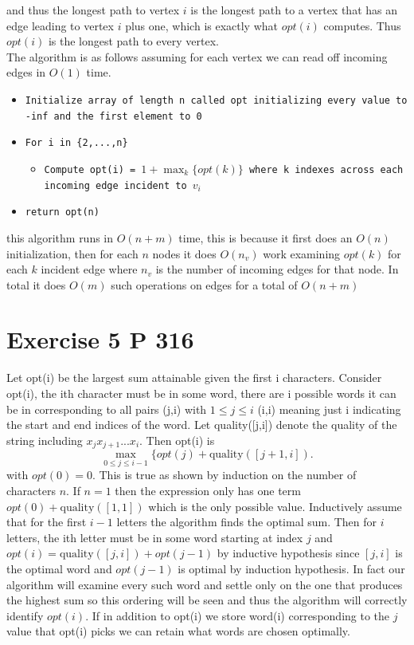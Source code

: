 \documentclass{amsart}
\begin{document}
and thus the longest path to vertex $i$ is the longest path to a vertex that has an edge leading to vertex  $i$ plus one, which is exactly what $opt(i)$ computes. Thus $opt(i)$ is
the longest path to every vertex.
\\
The algorithm is as follows assuming for each vertex we can read off incoming edges in $O(1)$ time.
{\small
    \begin{itemize}
        \item \texttt{Initialize array of length n called opt initializing every value to -inf and the first element to 0}
        \item \texttt{For i in \{2,...,n\}}
            \begin{itemize}
                \item \texttt{Compute opt(i) = $1 + \max_k\{opt(k)\}$ where k indexes across each incoming edge incident to $v_i$}
            \end{itemize}
        \item \texttt{return opt(n)}
    \end{itemize}
}
this algorithm runs in $O(n+m)$ time, this is because it first does an $O(n)$ initialization, then for each $n$ nodes it does $O(n_v)$ work
examining $opt(k)$ for each $k$  incident edge where $n_v$ is the number of incoming edges for that node. In total it does $O(m)$ such operations on edges for a total of $O(n+m)$


\section{Exercise 5 P 316}
Let opt(i) be the largest sum attainable given the first i characters.
Consider opt(i), the ith character must be in some word, there are i possible words it can be in corresponding to all
pairs (j,i) with $1 \le j \le i$ (i,i) meaning just i indicating the start and end indices of the word. 
Let quality([j,i]) denote the quality of the string including  $x_jx_{j+1}...x_i$. Then opt(i) is 
 \[
     \max_{0 \le j \le i-1}\{opt(j)+\text{quality}([j+1,i])
.\] 
with $opt(0) = 0$.
This is true as shown by induction on the number of characters  $n$. If $n=1$ then the expression only has one term $opt(0) + \text{quality}([1,1])$ 
which is the only possible value. Inductively assume that for the first $i-1$ letters the algorithm finds the optimal sum. Then for $i$ letters,
the  ith letter must be in some word starting at index $j$ and $opt(i) = \text{quality}([j,i]) + opt(j-1)$ by inductive hypothesis since  $[j,i]$ is the optimal word
and $opt(j-1)$ is optimal by induction hypothesis. In fact our algorithm will examine every such word and settle only on the one that produces the highest sum so this ordering will be seen
and thus the algorithm will correctly identify $opt(i)$. If in addition to opt(i) we store word(i) corresponding to the $j$ value that opt(i) picks we can retain what words
are chosen optimally.
\end{document}
